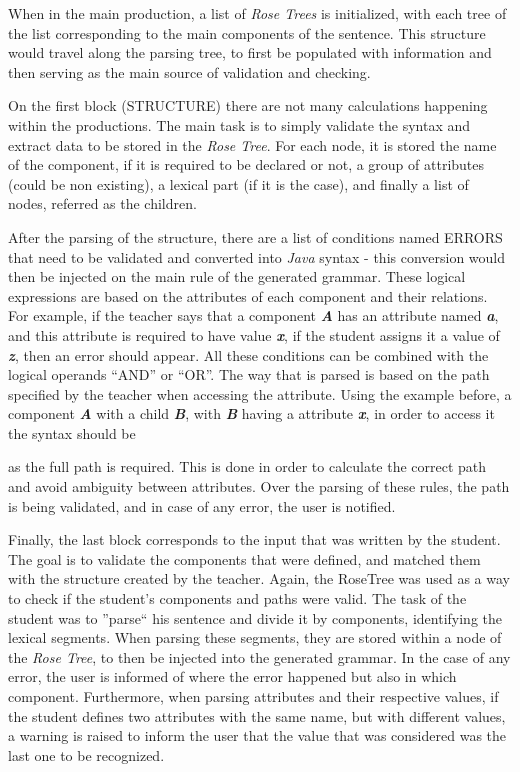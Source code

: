 When in the main production, a list of \emph{Rose Trees} is initialized, with each tree of the list corresponding to the main components of the sentence. This structure would travel along the parsing tree, to first be populated with information and then serving as the main source of validation and checking.

On the first block (STRUCTURE) there are not many calculations happening within the productions. The main task is to simply validate the syntax and extract data to be stored in the \emph{Rose Tree}. For each node, it is stored the name of the component, if it is required to be declared or not, a group of attributes (could be non existing), a lexical part (if it is the case), and finally a list of nodes, referred as the children.

After the parsing of the structure, there are a list of conditions named ERRORS that need to be validated and converted into \emph{Java} syntax - this conversion would then be injected on the main rule of the generated grammar. These logical expressions are based on the attributes of each component and their relations. For example, if the teacher says that a component \emph{\textbf{A}} has an attribute named \emph{\textbf{a}}, and this attribute is required to have value \emph{\textbf{x}}, if the student assigns it a value of \emph{\textbf{z}}, then an error should appear. All these conditions can be combined with the logical operands ``AND'' or ``OR''. The way that is parsed is based on the path specified by the teacher when accessing the attribute. Using the example before, a component \emph{\textbf{A}} with a child \emph{\textbf{B}}, with \emph{\textbf{B}} having a attribute \emph{\textbf{x}}, in order to access it the syntax should be

as the full path is required. This is done in order to calculate the correct path and avoid ambiguity between attributes. Over the parsing of these rules, the path is being validated, and in case of any error, the user is notified.

Finally, the last block corresponds to the input that was written by the student. The goal is to validate the components that were defined, and matched them with the structure created by the teacher. Again, the RoseTree was used as a way to check if the student’s components and paths were valid. The task of the student was to ''parse`` his sentence and divide it by components, identifying the lexical segments. When parsing these segments, they are stored within a node of the \emph{Rose Tree}, to then be injected into the generated grammar. In the case of any error, the user is informed of where the error happened but also in which component. Furthermore, when parsing attributes and their respective values, if the student defines two attributes with the same name, but with different values, a warning is raised to inform the user that the value that was considered was the last one to be recognized. 

